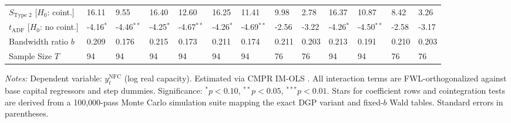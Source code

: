 \begin{table}[h!]
\begin{tabular}{p{3.2cm}p{1.0cm}p{1.0cm}p{1.0cm}p{1.0cm}p{1.0cm}p{1.0cm}p{1.0cm}p{1.0cm}p{1.0cm}p{1.0cm}p{1.0cm}p{1.0cm}}
$S_{\text{Type 2}}$ [$H_0$: coint.] & 16.11 & 9.55 & 16.40 & 12.60 & 16.25 & 11.41 & 9.98 & 2.78 & 16.37 & 10.87 & 8.42 & 3.26 \\
$t_{\text{ADF}}$ [$H_0$: no coint.] & -4.16$^{*}$ & -4.46$^{**}$ & -4.25$^{*}$ & -4.67$^{**}$ & -4.26$^{*}$ & -4.69$^{**}$ & -2.56 & -3.22 & -4.26$^{*}$ & -4.50$^{**}$ & -2.58 & -3.17 \\
Bandwidth ratio $b$ & 0.209 & 0.176 & 0.215 & 0.173 & 0.211 & 0.174 & 0.211 & 0.203 & 0.213 & 0.191 & 0.210 & 0.203 \\
Sample Size $T$ & 94 & 94 & 94 & 94 & 94 & 94 & 76 & 76 & 94 & 94 & 76 & 76 \\
\bottomrule
\end{tabular}
\begin{minipage}{\textwidth}
\scriptsize
\textit{Notes:} Dependent variable: $y_t^{\text{NFC}}$ (log real capacity). Estimated via CMPR IM-OLS \citep{VogelsangWagner2024}. All interaction terms are FWL-orthogonalized against base capital regressors and step dummies. Significance: $^*p<0.10$, $^{**}p<0.05$, $^{***}p<0.01$. Stars for coefficient rows and cointegration tests are derived from a 100,000-pass Monte Carlo simulation suite mapping the exact DGP variant and fixed-$b$ Wald tables. Standard errors in parentheses.
\end{minipage}
\end{table}


